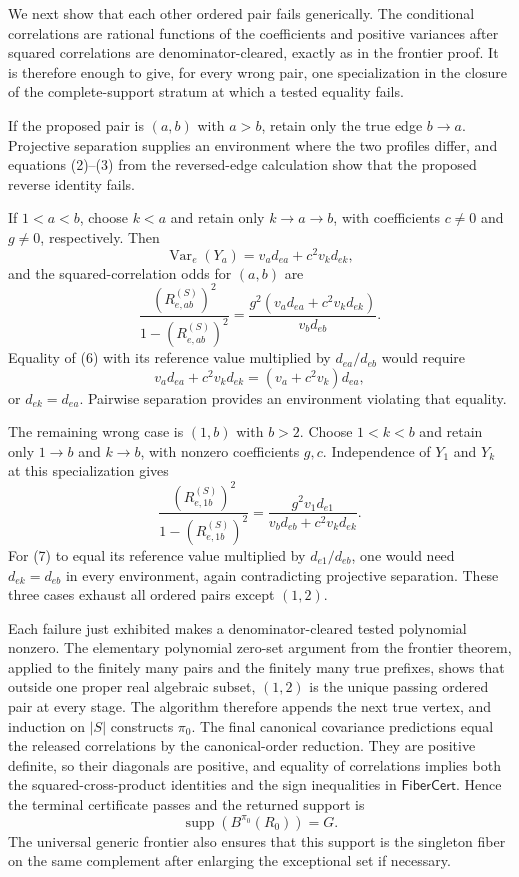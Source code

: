We next show that each other ordered pair fails generically.  The conditional correlations are rational functions of the coefficients and positive variances after squared correlations are denominator-cleared, exactly as in the frontier proof.  It is therefore enough to give, for every wrong pair, one specialization in the closure of the complete-support stratum at which a tested equality fails.

If the proposed pair is \((a,b)\) with \(a>b\), retain only the true edge \(b\to a\).  Projective separation supplies an environment where the two profiles differ, and equations (2)--(3) from the reversed-edge calculation show that the proposed reverse identity fails.

If \(1<a<b\), choose \(k<a\) and retain only \(k\to a\to b\), with coefficients \(c\ne0\) and \(g\ne0\), respectively.  Then
\[
 \operatorname{Var}_e(Y_a)=v_ad_{ea}+c^2v_kd_{ek},
\]
and the squared-correlation odds for \((a,b)\) are
\[
 \frac{(R_{e,ab}^{(S)})^2}{1-(R_{e,ab}^{(S)})^2}
 =\frac{g^2(v_ad_{ea}+c^2v_kd_{ek})}{v_bd_{eb}}. \tag{6}
\]
Equality of (6) with its reference value multiplied by \(d_{ea}/d_{eb}\) would require
\[
 v_ad_{ea}+c^2v_kd_{ek}=(v_a+c^2v_k)d_{ea},
\]
or \(d_{ek}=d_{ea}\).  Pairwise separation provides an environment violating that equality.

The remaining wrong case is \((1,b)\) with \(b>2\).  Choose \(1<k<b\) and retain only \(1\to b\) and \(k\to b\), with nonzero coefficients \(g,c\).  Independence of \(Y_1\) and \(Y_k\) at this specialization gives
\[
 \frac{(R_{e,1b}^{(S)})^2}{1-(R_{e,1b}^{(S)})^2}
 =\frac{g^2v_1d_{e1}}{v_bd_{eb}+c^2v_kd_{ek}}. \tag{7}
\]
For (7) to equal its reference value multiplied by \(d_{e1}/d_{eb}\), one would need \(d_{ek}=d_{eb}\) in every environment, again contradicting projective separation.  These three cases exhaust all ordered pairs except \((1,2)\).

Each failure just exhibited makes a denominator-cleared tested polynomial nonzero.  The elementary polynomial zero-set argument from the frontier theorem, applied to the finitely many pairs and the finitely many true prefixes, shows that outside one proper real algebraic subset, \((1,2)\) is the unique passing ordered pair at every stage.  The algorithm therefore appends the next true vertex, and induction on \(|S|\) constructs \(\pi_0\).  The final canonical covariance predictions equal the released correlations by the canonical-order reduction.  They are positive definite, so their diagonals are positive, and equality of correlations implies both the squared-cross-product identities and the sign inequalities in \(\mathsf{FiberCert}\).  Hence the terminal certificate passes and the returned support is
\[
 \operatorname{supp}(B^{\pi_0}(R_0))=G.
\]
The universal generic frontier also ensures that this support is the singleton fiber on the same complement after enlarging the exceptional set if necessary.

